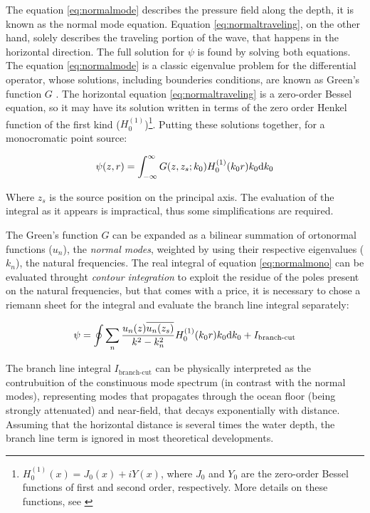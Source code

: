  The equation \ref{eq:normalmode} describes the pressure field along the depth,
 it is known as the normal mode equation. Equation \ref{eq:normaltraveling}, on
 the other hand, solely describes the traveling portion of the wave, that
 happens in the horizontal direction.
 The full solution for $\psi$ is found by solving both equations. The equation
 \ref{eq:normalmode} is a classic eigenvalue problem for the differential
 operator, whose solutions, including bounderies conditions, are known as
 Green's function $G$ \cite{desanto2012scalar}. The horizontal equation
 \ref{eq:normaltraveling} is a zero-order Bessel equation, so it may have its
 solution written in terms of the zero order Henkel function of the first kind
 ($H_0^{(1)}$)\footnote{$H_0^{(1)}(x) = J_0(x)+iY(x)$, where $J_0$ and $Y_0$
 are the zero-order Bessel functions of first and second order, respectively.
 More details on these functions, see \citet{abramowitz1964handbook}}. Putting
 these solutions together, for a monocromatic point source:
 
 \begin{equation}
 \label{eq:normalmono}
 \psi(z,r) = \int_{-\infty}^{\infty} G(z,z_s;k_0)H_0^{(1)}(k_0r)k_0\mathrm{d} k_0
 \end{equation}
 
Where $z_s$ is the source position on the principal axis. The evaluation of the
integral as it appears is impractical, thus some simplifications are required.

The Green's function $G$ can be expanded as a bilinear summation of ortonormal
functions ($u_ n$), the \textit{normal modes}\cite{baker2003green}, weighted by
using their respective eigenvalues ($k_n$), the natural frequencies. The real
integral of equation \ref{eq:normalmono} can be evaluated throught \textit{contour
integration} to exploit the residue of the poles present on the natural
frequencies, but that comes with a price, it is necessary to chose a riemann
sheet for the integral and evaluate the branch line integral
separately\cite{jensen2011computational,worzel1948propagation}:

\begin{equation}
\psi = \oint \sum_n{\frac{u_n(z)\overline{u_n(z_s)}}{k^2 -
k_n^2}H_0^{(1)}(k_0r)k_0\mathrm{d} k_0} + I_{\text{branch-cut}}
\end{equation}

The branch line integral $I_{\text{branch-cut}}$ can be physically interpreted
as the contrubuition of the constinuous mode spectrum (in contrast with the
normal modes), representing modes that propagates through the ocean floor
(being strongly attenuated) and near-field, that decays exponentially with
distance. Assuming that the horizontal distance is several times the water
depth, the branch line term is ignored in most theoretical developments.

